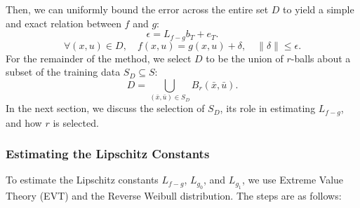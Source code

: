 \documentclass{article}
\begin{document}
Then, we can uniformly bound the error across the entire set \( D \) to yield a simple and exact relation between \( f \) and \( g \):
\[
\epsilon = L_{f-g} b_T + e_T.
\]
\[
\forall (x, u) \in D, \quad f(x, u) = g(x, u) + \delta, \quad \|\delta\| \leq \epsilon.
\]
For the remainder of the method, we select \( D \) to be the union of \( r \)-balls about a subset of the training data \( S_D \subseteq S \):
\[
D = \bigcup_{(\bar{x},\bar{u}) \in S_D} B_r(\bar{x}, \bar{u}).
\]
In the next section, we discuss the selection of \( S_D \), its role in estimating \( L_{f-g} \), and how \( r \) is selected.

\subsubsection{Estimating the Lipschitz Constants}
To estimate the Lipschitz constants \( L_{f-g} \), \( L_{g_0} \), and \( L_{g_1} \), we use Extreme Value Theory (EVT) and the Reverse Weibull distribution. The steps are as follows:
\end{document}
